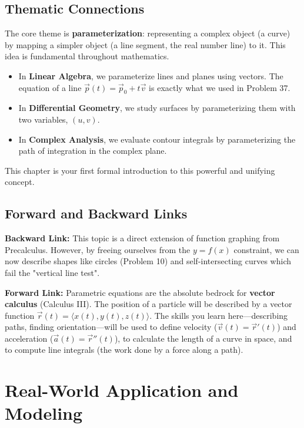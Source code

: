 \documentclass{article}
\begin{document}
\subsection{Thematic Connections}
The core theme is \textbf{parameterization}: representing a complex object (a curve) by mapping a simpler object (a line segment, the real number line) to it. This idea is fundamental throughout mathematics.
\begin{itemize}
    \item In \textbf{Linear Algebra}, we parameterize lines and planes using vectors. The equation of a line \(\vec{p}(t) = \vec{p}_0 + t\vec{v}\) is exactly what we used in Problem 37.
    \item In \textbf{Differential Geometry}, we study surfaces by parameterizing them with two variables, \((u,v)\).
    \item In \textbf{Complex Analysis}, we evaluate contour integrals by parameterizing the path of integration in the complex plane.
\end{itemize}
This chapter is your first formal introduction to this powerful and unifying concept.

\subsection{Forward and Backward Links}
\textbf{Backward Link:} This topic is a direct extension of function graphing from Precalculus. However, by freeing ourselves from the \(y=f(x)\) constraint, we can now describe shapes like circles (Problem 10) and self-intersecting curves which fail the "vertical line test".

\textbf{Forward Link:} Parametric equations are the absolute bedrock for \textbf{vector calculus} (Calculus III). The position of a particle will be described by a vector function \(\vec{r}(t) = \langle x(t), y(t), z(t) \rangle\). The skills you learn here—describing paths, finding orientation—will be used to define velocity (\(\vec{v}(t) = \vec{r}'(t)\)) and acceleration (\(\vec{a}(t) = \vec{r}''(t)\)), to calculate the length of a curve in space, and to compute line integrals (the work done by a force along a path).

\section{Real-World Application and Modeling}
\end{document}
